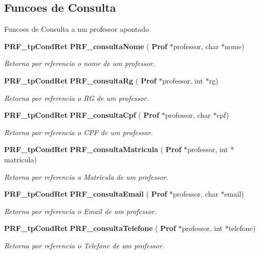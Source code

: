 \subsection*{Funcoes de Consulta}
\label{_amgrp0ba36836b8fcf8533123a3e6379d4e73}%
Funcoes de Consulta a um professor apontado \begin{DoxyCompactItemize}
\item 
\textbf{ P\+R\+F\+\_\+tp\+Cond\+Ret} \textbf{ P\+R\+F\+\_\+consulta\+Nome} (\textbf{ Prof} $\ast$professor, char $\ast$nome)
\begin{DoxyCompactList}\small\item\em Retorna por referencia o nome de um professor. \end{DoxyCompactList}\item 
\textbf{ P\+R\+F\+\_\+tp\+Cond\+Ret} \textbf{ P\+R\+F\+\_\+consulta\+Rg} (\textbf{ Prof} $\ast$professor, int $\ast$rg)
\begin{DoxyCompactList}\small\item\em Retorna por referencia o RG de um professor. \end{DoxyCompactList}\item 
\textbf{ P\+R\+F\+\_\+tp\+Cond\+Ret} \textbf{ P\+R\+F\+\_\+consulta\+Cpf} (\textbf{ Prof} $\ast$professor, char $\ast$cpf)
\begin{DoxyCompactList}\small\item\em Retorna por referencia o C\+PF de um professor. \end{DoxyCompactList}\item 
\textbf{ P\+R\+F\+\_\+tp\+Cond\+Ret} \textbf{ P\+R\+F\+\_\+consulta\+Matricula} (\textbf{ Prof} $\ast$professor, int $\ast$matricula)
\begin{DoxyCompactList}\small\item\em Retorna por referencia a Matricula de um professor. \end{DoxyCompactList}\item 
\textbf{ P\+R\+F\+\_\+tp\+Cond\+Ret} \textbf{ P\+R\+F\+\_\+consulta\+Email} (\textbf{ Prof} $\ast$professor, char $\ast$email)
\begin{DoxyCompactList}\small\item\em Retorna por referencia o Email de um professor. \end{DoxyCompactList}\item 
\textbf{ P\+R\+F\+\_\+tp\+Cond\+Ret} \textbf{ P\+R\+F\+\_\+consulta\+Telefone} (\textbf{ Prof} $\ast$professor, int $\ast$telefone)
\begin{DoxyCompactList}\small\item\em Retorna por referencia o Telefone de um professor. \end{DoxyCompactList}\item 

\end{DoxyCompactItemize}
